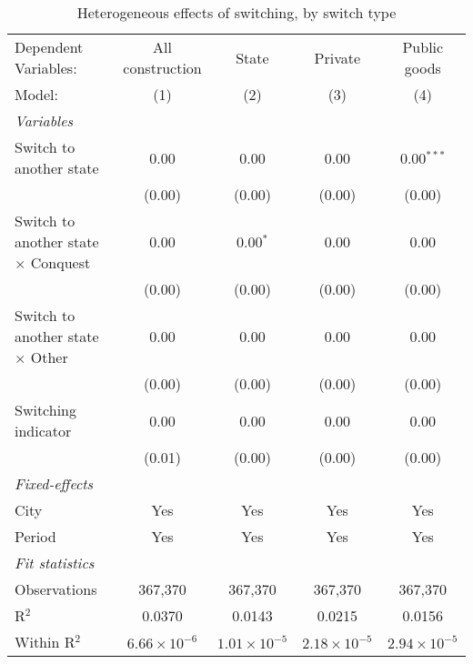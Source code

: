 \begin{table}[htbp]
   \caption{\label{tab:baseline_1y} Heterogeneous effects of switching, by switch type}
   \centering
   \begin{tabular}{lcccc}
      \tabularnewline \midrule \midrule
      Dependent Variables:                       & All construction      & State                 & Private               & Public goods\\  
      Model:                                     & (1)                   & (2)                   & (3)                   & (4)\\  
      \midrule
      \emph{Variables}\\
      Switch to another state                    & 0.00                  & 0.00                  & 0.00                  & 0.00$^{***}$\\   
                                                 & (0.00)                & (0.00)                & (0.00)                & (0.00)\\   
      Switch to another state $\times$ Conquest  & 0.00                  & 0.00$^{*}$            & 0.00                  & 0.00\\   
                                                 & (0.00)                & (0.00)                & (0.00)                & (0.00)\\   
      Switch to another state $\times$ Other     & 0.00                  & 0.00                  & 0.00                  & 0.00\\   
                                                 & (0.00)                & (0.00)                & (0.00)                & (0.00)\\   
      Switching indicator                        & 0.00                  & 0.00                  & 0.00                  & 0.00\\   
                                                 & (0.01)                & (0.00)                & (0.00)                & (0.00)\\   
      \midrule
      \emph{Fixed-effects}\\
      City                                       & Yes                   & Yes                   & Yes                   & Yes\\  
      Period                                     & Yes                   & Yes                   & Yes                   & Yes\\  
      \midrule
      \emph{Fit statistics}\\
      Observations                               & 367,370               & 367,370               & 367,370               & 367,370\\  
      R$^2$                                      & 0.0370                & 0.0143                & 0.0215                & 0.0156\\  
      Within R$^2$                               & $6.66\times 10^{-6}$  & $1.01\times 10^{-5}$  & $2.18\times 10^{-5}$  & $2.94\times 10^{-5}$\\   
      \midrule \midrule
      

\end{tabular}
\end{table}
